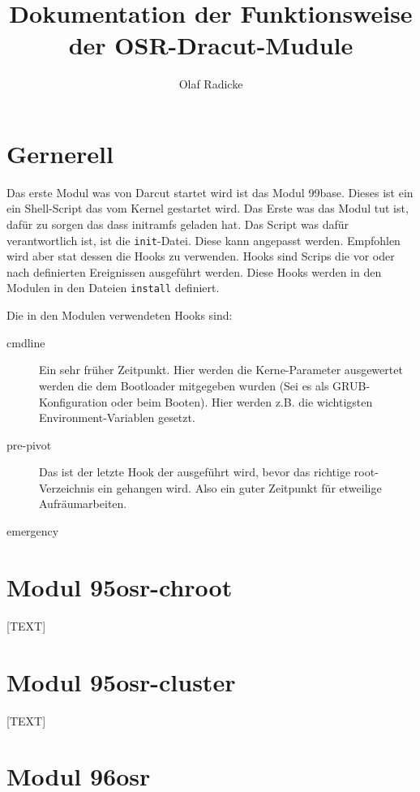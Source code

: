 \documentclass[10pt,a4paper,titlepage]{article}
\author{Olaf Radicke}
\title{Dokumentation der Funktionsweise der OSR-Dracut-Mudule}
\begin{document}
\maketitle

\newpage 

\tableofcontents

\newpage 

\section{Gernerell}

Das erste Modul was von Darcut startet wird ist das Modul 99base. Dieses ist ein ein Shell-Script das vom Kernel gestartet wird. Das Erste was das Modul tut ist, dafür zu sorgen das dass initramfs geladen hat. Das Script was dafür verantwortlich ist, ist die \texttt{init}-Datei. Diese kann angepasst werden. Empfohlen wird aber stat dessen die Hooks zu verwenden. Hooks sind Scrips die vor oder nach definierten Ereignissen ausgeführt werden. Diese Hooks werden in den Modulen in den Dateien \texttt{install} definiert.

Die in den Modulen verwendeten Hooks sind:
\begin{description}
 \item[cmdline] Ein sehr früher Zeitpunkt. Hier werden die Kerne-Parameter ausgewertet werden die dem Bootloader mitgegeben wurden (Sei es als GRUB-Konfiguration oder beim Booten). Hier werden z.B. die wichtigsten Environment-Variablen gesetzt. 
 \item[pre-pivot] Das ist der letzte Hook der ausgeführt wird, bevor  das richtige root-Verzeichnis ein gehangen wird. Also ein guter Zeitpunkt für etweilige Aufräumarbeiten.
 \item[emergency]
 \item[]
 \end{description}

\section{Modul 95osr-chroot}

[TEXT]

\section{Modul 95osr-cluster}

[TEXT]

\section{Modul 96osr}
\end{document}
